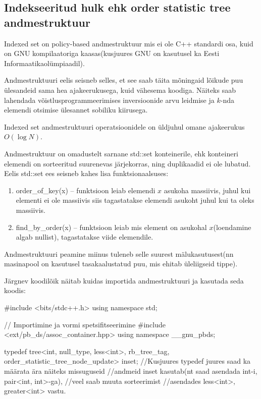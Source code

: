 \documentclass{trkut}
\theoremstyle{definition}
\begin{document}
\begin{appendices}
 \chapter{Indekseeritud hulk ehk order statistic tree andmestruktuur}\label{lisa13}
    \tiny
    \normalsize
Indexed set on policy-based andmestruktuur mis ei ole C++ standardi osa, kuid on GNU kompilaatoriga kaasas(kusjuures GNU on kasutusel ka Eesti Informaatikaolümpiaadil).

Andmestruktuuri eelis seisneb selles, et see saab täita mõningaid lõikude puu ülesandeid sama hea ajakeerukusega, kuid vähesema koodiga.
Näiteks saab lahendada võistlusprogrammeerimises inversioonide arvu leidmise ja $k$-nda elemendi otsimise ülesannet sobiliku kiirusega.

Indexed set andmestruktuuri operatsioonidele on üldjuhul omane ajakeerukus $O(\log N)$.

Andmestruktuur on omadustelt sarnane std::set konteinerile, ehk konteineri elemendi on sorteeritud suurenevas järjekorras, ning duplikaadid ei ole lubatud.
Eelis std::set ees seisneb kahes lisa funktsionaalsuses:
\begin{enumerate}
    \item order\_of\_key(x) -- funktsioon leiab elemendi $x$ asukoha massiivis, juhul kui elementi ei ole massiivis siis tagastatakse elemendi asukoht juhul kui ta oleks massiivis. 
    \item find\_by\_order(x) -- funktsioon leiab mis element on asukohal $x$(loendamine algab nullist), tagastatakse viide elemendile.
\end{enumerate}

Andmestruktuuri peamine miinus tuleneb selle suurest mälukasutusest(nn masinapool on kasutusel tasakaalustatud puu, mis ehitab üleliigseid tippe).

Järgnev koodilõik näitab kuidas importida andmestruktuuri ja kasutada seda koodis:

\begin{cclol}
    #include <bits/stdc++.h>
    using namespace std;

    // Importimine ja vormi spetsifitseerimine
    #include <ext/pb_ds/assoc_container.hpp>
    using namespace __gnu_pbds;
    
    typedef tree<int, null_type, less<int>, rb_tree_tag, 
    order_statistic_tree_node_update> inset;
//Kusjuures typedef juures saad ka määrata ära näiteks missuguseid 
//andmeid inset kasutab(nt saad asendada int-i, pair<int, int>-ga), 
//veel saab muuta sorteerimist 
//asendades less<int>, greater<int> vastu.


\end{cclol}
\end{appendices}
\end{document}
